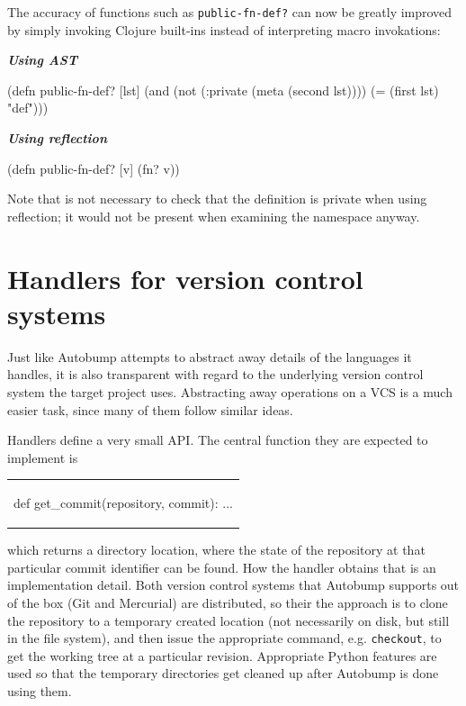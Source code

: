 \documentclass{l4proj}
\newenvironment{halfmini}[1]
{
\begin{minipage}[t]{0.5\textwidth}
\noindent\textbf{\textit{#1}}\\
}
{
\end{minipage}
}
\newcommand\genericstyle{\lstset{basicstyle=\ttm}}
\newcommand\codeinline[1]{{\genericstyle\lstinline!#1!}}
\begin{document}
The accuracy of functions such as \codeinline{public-fn-def?} can now
be greatly improved by simply invoking Clojure built-ins instead of
interpreting macro invokations:

\begin{halfmini}{Using AST}
\begin{clojure}
(defn public-fn-def? [lst]
  (and
    (not (:private (meta (second lst))))
    (= (first lst) "def")))
\end{clojure}
\end{halfmini}
\begin{halfmini}{Using reflection}
\begin{clojure}
(defn public-fn-def? [v]
  (fn? v))
\end{clojure}
\end{halfmini}

Note that is not necessary to check that the definition is private
when using reflection; it would not be present when examining the
namespace anyway.

\section{Handlers for version control systems}
\label{VCSHandlers}

Just like Autobump attempts to abstract away details of the languages
it handles, it is also transparent with regard to the underlying
version control system the target project uses. Abstracting away
operations on a VCS is a much easier task, since many of them follow
similar ideas.

Handlers define a very small API. The central function they are
expected to implement is

\begin{center}
\begin{tabular}{c}
\begin{python}
def get_commit(repository, commit):
    ...
\end{python}
\end{tabular}
\end{center}

which returns a directory location, where the state of the repository
at that particular commit identifier can be found. How the handler
obtains that is an implementation detail. Both version control systems
that Autobump supports out of the box (Git and Mercurial) are
distributed, so their the approach is to clone the repository to a
temporary created location (not necessarily on disk, but still in the
file system), and then issue the appropriate command, e.g.
\codeinline{checkout}, to get the working tree at a particular
revision. Appropriate Python features are used so that the temporary
directories get cleaned up after Autobump is done using them.
\end{document}
